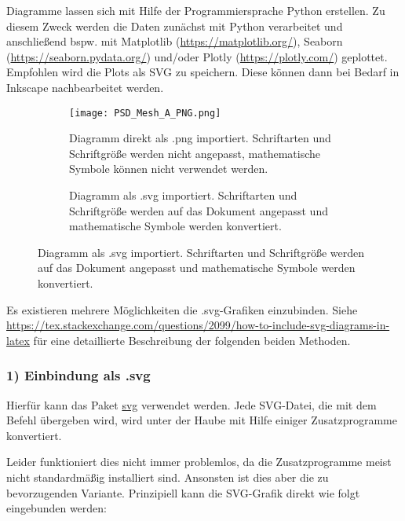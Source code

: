 Diagramme lassen sich mit Hilfe der Programmiersprache Python erstellen. Zu diesem Zweck werden die Daten zunächst mit Python verarbeitet und anschließend bspw. mit Matplotlib (\url{https://matplotlib.org/}), Seaborn (\url{https://seaborn.pydata.org/}) und/oder Plotly (\url{https://plotly.com/}) geplottet. Empfohlen wird die Plots als SVG zu speichern. Diese können dann bei Bedarf in Inkscape nachbearbeitet werden. 

\begin{figure}[ht]
    \begin{footnotesize}
    	\centering
    	\begin{subfigure}[b]{0.45\textwidth}
    		\centering
    		\texttt{[image: PSD\_Mesh\_A\_PNG.png]}
    		\caption{%
    		    Diagramm direkt als .png importiert. Schriftarten und Schriftgröße werden nicht angepasst, mathematische Symbole können nicht verwendet werden.
    		}
    		\label{fig:png_import}
    	\end{subfigure}
    	\hspace{0.05\textwidth}
    	\begin{subfigure}[b]{0.45\textwidth}
    		\centering
    		
    		\caption{%
    		    Diagramm als .svg importiert. Schriftarten und Schriftgröße werden auf das Dokument angepasst und mathematische Symbole werden konvertiert.
    		}
    		\label{fig:svg_import}
    	\end{subfigure}
    \end{footnotesize}
\end{figure}

Es existieren mehrere Möglichkeiten die .svg-Grafiken einzubinden. Siehe \url{https://tex.stackexchange.com/questions/2099/how-to-include-svg-diagrams-in-latex} für eine detaillierte Beschreibung der folgenden beiden Methoden. 

\subsubsection{1) Einbindung als .svg}

Hierfür kann das Paket \href{https://www.ctan.org/tex-archive/graphics/svg}{svg} verwendet werden. Jede SVG-Datei, die mit dem Befehl \verb!! übergeben wird, wird unter der Haube mit Hilfe einiger Zusatzprogramme konvertiert.

Leider funktioniert dies nicht immer problemlos, da die Zusatzprogramme meist nicht standardmäßig installiert sind. Ansonsten ist dies aber die zu bevorzugenden Variante. Prinzipiell kann die SVG-Grafik direkt wie folgt eingebunden werden:

